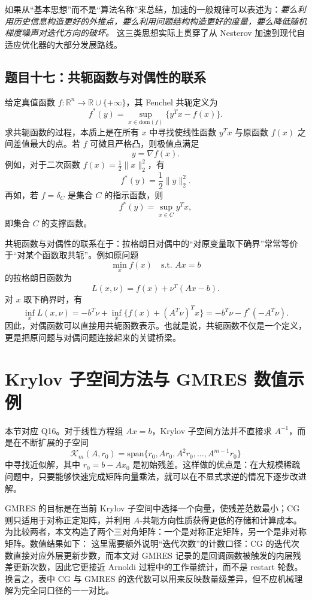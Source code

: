 \documentclass[UTF8,a4paper,12pt,fontset=none]{ctexart}
\begin{document}
如果从“基本思想”而不是“算法名称”来总结，加速的一般规律可以表述为：\emph{要么利用历史信息构造更好的外推点，要么利用问题结构构造更好的度量，要么降低随机梯度噪声对迭代方向的破坏。} 这三类思想实际上贯穿了从 Nesterov 加速到现代自适应优化器的大部分发展路线。

\subsection{题目十七：共轭函数与对偶性的联系}

给定真值函数 $f: \mathbb{R}^n\to\mathbb{R}\cup\{+\infty\}$，其 Fenchel 共轭定义为
\[
f^*(y)=\sup_{x\in\mathrm{dom}(f)}\{y^Tx-f(x)\}.
\]
求共轭函数的过程，本质上是在所有 $x$ 中寻找使线性函数 $y^Tx$ 与原函数 $f(x)$ 之间差值最大的点。若 $f$ 可微且严格凸，则极值点满足
\[
y=\nabla f(x).
\]
例如，对于二次函数 $f(x)=\frac12\lVert x\rVert_2^2$，有
\[
f^*(y)=\frac12\lVert y\rVert_2^2.
\]
再如，若 $f=\delta_C$ 是集合 $C$ 的指示函数，则
\[
f^*(y)=\sup_{x\in C}y^Tx,
\]
即集合 $C$ 的支撑函数。

共轭函数与对偶性的联系在于：拉格朗日对偶中的“对原变量取下确界”常常等价于“对某个函数取共轭”。例如原问题
\[
\min_x f(x)\quad \text{s.t. } Ax=b
\]
的拉格朗日函数为
\[
L(x,\nu)=f(x)+\nu^T(Ax-b).
\]
对 $x$ 取下确界时，有
\[
\inf_x L(x,\nu)
=-b^T\nu+\inf_x\{f(x)+(A^T\nu)^Tx\}
=-b^T\nu-f^*(-A^T\nu).
\]
因此，对偶函数可以直接用共轭函数表示。也就是说，共轭函数不仅是一个定义，更是把原问题与对偶问题连接起来的关键桥梁。

\section{Krylov 子空间方法与 GMRES 数值示例}

本节对应 Q16。对于线性方程组 $Ax=b$，Krylov 子空间方法并不直接求 $A^{-1}$，而是在不断扩展的子空间
\[
\mathcal{K}_m(A,r_0)=\mathrm{span}\{r_0,Ar_0,A^2r_0,\ldots,A^{m-1}r_0\}
\]
中寻找近似解，其中 $r_0=b-Ax_0$ 是初始残差。这样做的优点是：在大规模稀疏问题中，只要能够快速完成矩阵向量乘法，就可以在不显式求逆的情况下逐步改进解。

GMRES 的目标是在当前 Krylov 子空间中选择一个向量，使残差范数最小；CG 则只适用于对称正定矩阵，并利用 $A$-共轭方向性质获得更低的存储和计算成本。为比较两者，本文构造了两个三对角矩阵：一个是对称正定矩阵，另一个是非对称矩阵。数值结果如下：
这里需要额外说明“迭代次数”的计数口径：CG 的迭代次数直接对应外层更新步数，而本文对 GMRES 记录的是回调函数被触发的内层残差更新次数，因此它更接近 Arnoldi 过程中的工作量统计，而不是 restart 轮数。换言之，表中 CG 与 GMRES 的迭代数可以用来反映数量级差异，但不应机械理解为完全同口径的一一对比。
\end{document}
